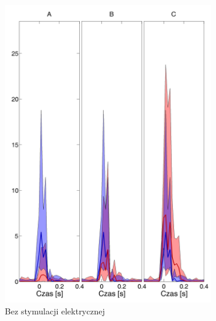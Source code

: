 \documentclass{pracamgr}
\begin{document}
	\begin{figure}[h]
		\begin{subfigure}{.5\textwidth}
			\centering
			\includegraphics[width=1.\linewidth]{kontrola15_20-40_z_CxC8_do_SC42.png}
			\caption{Bez stymulacji elektrycznej}
			\label{rys:20_40_kon_CxC_SC}
		\end{subfigure}%
		\begin{subfigure}{.5\textwidth}
			\centering

\end{subfigure}
\end{figure}
\end{document}
